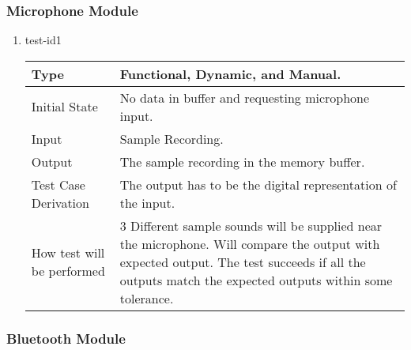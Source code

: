 \documentclass[12pt, titlepage]{article}
\begin{document}

\subsubsection{Microphone Module}


\begin{enumerate}

\item{test-id1\\}

\begin{tabular}{ |p{5cm}||p{7cm}| }
    \hline
    Type & Functional, Dynamic, and Manual. \\
    \hline
    Initial State  &  No data in buffer and requesting microphone input.\\
    \hline
    Input &   Sample Recording.  \\
    \hline
    Output &   The sample recording in the memory buffer.  \\
    \hline
    Test Case Derivation &   The output has to be the digital representation of the input.\\
    \hline
    How test will be performed & 3 Different sample sounds will be supplied near the microphone. Will compare the output with expected output. The test succeeds if all the outputs match the expected outputs within some tolerance.     \\
    \hline
\end{tabular}
    
\end{enumerate}

\subsubsection{Bluetooth Module}
\end{document}
